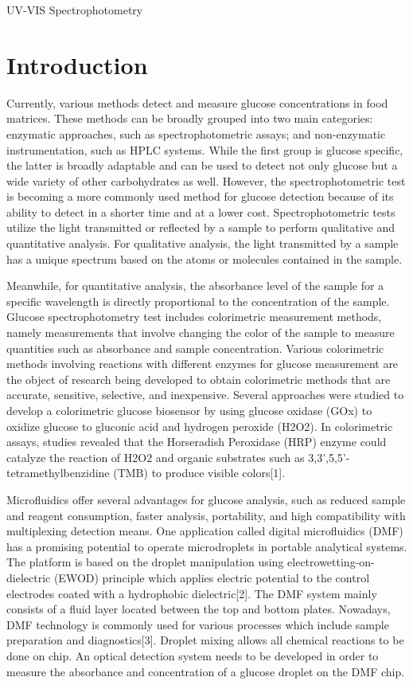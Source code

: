 \documentclass[conference]{IEEEtran}
\begin{document}
\begin{IEEEkeywords}
    UV-VIS Spectrophotometry
\end{IEEEkeywords}

\section{Introduction}
Currently, various methods detect and measure glucose concentrations in food matrices. These methods can be broadly grouped into two main categories: enzymatic approaches, such as spectrophotometric assays; and non-enzymatic instrumentation, such as HPLC systems. While the first group is glucose specific, the latter is broadly adaptable and can be used to detect not only glucose but a wide variety of other carbohydrates as well. However, the spectrophotometric test is becoming a more commonly used method for glucose detection because of its ability to detect in a shorter time and at a lower cost. Spectrophotometric tests utilize the light transmitted or reflected by a sample to perform qualitative and quantitative analysis. For qualitative analysis, the light transmitted by a sample has a unique spectrum based on the atoms or molecules contained in the sample.  

Meanwhile, for quantitative analysis, the absorbance level of the sample for a specific wavelength is directly proportional to the concentration of the sample. Glucose spectrophotometry test includes colorimetric measurement methods, namely measurements that involve changing the color of the sample to measure quantities such as absorbance and sample concentration. Various colorimetric methods involving reactions with different enzymes for glucose measurement are the object of research being developed to obtain colorimetric methods that are accurate, sensitive, selective, and inexpensive.  Several approaches were studied to develop a colorimetric glucose biosensor by using glucose oxidase (GOx) to oxidize glucose to gluconic acid and hydrogen peroxide (H2O2). In colorimetric assays, studies revealed that the Horseradish Peroxidase (HRP) enzyme could catalyze the reaction of H2O2 and organic substrates such as 3,3',5,5'-tetramethylbenzidine (TMB) to produce visible colors[1]. 

Microfluidics offer several advantages for glucose analysis, such as reduced sample and reagent consumption, faster analysis, portability, and high compatibility with multiplexing detection means. One application called digital microfluidics (DMF) has a promising potential to operate microdroplets in portable analytical systems. The platform is based on the droplet manipulation using electrowetting-on-dielectric (EWOD) principle which applies electric potential to the control electrodes coated with a hydrophobic dielectric[2]. The DMF system mainly consists of a fluid layer located between the top and bottom plates. Nowadays, DMF technology is commonly used for various processes which include sample preparation and diagnostics[3]. Droplet mixing allows all chemical reactions to be done on chip. An optical detection system needs to be developed in order to measure the absorbance and concentration of a glucose droplet on the DMF chip. 
\end{document}

